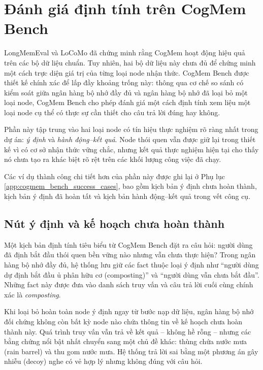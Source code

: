 \documentclass[../main.tex]{subfiles}
\begin{document}
\section{Đánh giá định tính trên CogMem Bench}

LongMemEval và LoCoMo đã chứng minh rằng CogMem hoạt động hiệu quả trên các bộ dữ liệu chuẩn. Tuy nhiên, hai bộ dữ liệu này chưa đủ để chứng minh một cách trực diện giá trị của từng loại node nhận thức. CogMem Bench được thiết kế chính xác để lấp đầy khoảng trống này: thông qua cơ chế so sánh có kiểm soát giữa ngân hàng bộ nhớ đầy đủ và ngân hàng bộ nhớ đã loại bỏ một loại node, CogMem Bench cho phép đánh giá một cách định tính xem liệu một loại node cụ thể có thực sự cần thiết cho câu trả lời đúng hay không.

Phần này tập trung vào hai loại node có tín hiệu thực nghiệm rõ ràng nhất trong dự án: \textit{ý định} và \textit{hành động--kết quả}. Node thói quen vẫn được giữ lại trong thiết kế vì có cơ sở nhận thức vững chắc, nhưng kết quả thực nghiệm hiện tại cho thấy nó chưa tạo ra khác biệt rõ rệt trên các khối lượng công việc đã chạy.

Các ví dụ thành công chi tiết hơn của phần này được ghi lại ở Phụ lục \ref{app:cogmem_bench_success_cases}, bao gồm kịch bản ý định chưa hoàn thành, kịch bản ý định đã hoàn tất và kịch bản hành động--kết quả trong vết công cụ.

\subsection{Nút ý định và kế hoạch chưa hoàn thành}

Một kịch bản định tính tiêu biểu từ CogMem Bench đặt ra câu hỏi: người dùng đã định bắt đầu thói quen bền vững nào nhưng vẫn chưa thực hiện? Trong ngân hàng bộ nhớ đầy đủ, hệ thống lưu giữ các fact thuộc loại ý định như ``người dùng dự định bắt đầu ủ phân hữu cơ (composting)'' và ``người dùng vẫn chưa bắt đầu''. Những fact này được đưa vào danh sách truy vấn và câu trả lời cuối cùng chính xác là \textit{composting}.

Khi loại bỏ hoàn toàn node ý định ngay từ bước nạp dữ liệu, ngân hàng bộ nhớ đối chứng không còn bất kỳ node nào chứa thông tin về kế hoạch chưa hoàn thành này. Quá trình truy vấn vẫn trả về kết quả -- không hề rỗng -- nhưng các bằng chứng nổi bật nhất chuyển sang một chủ đề khác: thùng chứa nước mưa (rain barrel) và thu gom nước mưa. Hệ thống trả lời sai bằng một phương án gây nhiễu (decoy) nghe có vẻ hợp lý nhưng không đúng với câu hỏi.
\end{document}
